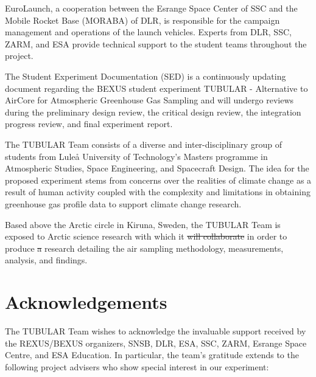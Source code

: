 \documentclass[a4paper,12pt,oneside]{article}
\providecommand{\DIFaddtex}[1]{{\protect\color{blue}\uwave{#1}}} %
\providecommand{\DIFdeltex}[1]{{\protect\color{red}\sout{#1}}}                      %
\providecommand{\DIFaddbegin}{} %
\providecommand{\DIFaddend}{} %
\providecommand{\DIFdelbegin}{} %
\providecommand{\DIFdelend}{} %
\providecommand{\DIFadd}[1]{\texorpdfstring{\DIFaddtex{#1}}{#1}} %
\providecommand{\DIFdel}[1]{\texorpdfstring{\DIFdeltex{#1}}{}} %
\newcommand{\DIFscaledelfig}{0.5}
\newlength{\DIFdelgraphicswidth} %
\newlength{\DIFdelgraphicsheight} %
\newcommand{\DIFaddincludegraphics}[2][]{{\color{blue}\fbox{\DIFOincludegraphics[#1]{#2}}}} %
\newcommand{\DIFdelincludegraphics}[2][]{%
\sbox{\DIFdelgraphicsbox}{\DIFOincludegraphics[#1]{#2}}%
\settoboxwidth{\DIFdelgraphicswidth}{\DIFdelgraphicsbox} %
\settoboxtotalheight{\DIFdelgraphicsheight}{\DIFdelgraphicsbox} %
\scalebox{\DIFscaledelfig}{%
\parbox[b]{\DIFdelgraphicswidth}{\usebox{\DIFdelgraphicsbox}\\[-\baselineskip] \rule{\DIFdelgraphicswidth}{0em}}\llap{\resizebox{\DIFdelgraphicswidth}{\DIFdelgraphicsheight}{%
\setlength{\unitlength}{\DIFdelgraphicswidth}%
\begin{picture}(1,1)%
\thicklines\linethickness{2pt} %
{\color[rgb]{1,0,0}\put(0,0){\framebox(1,1){}}}%
{\color[rgb]{1,0,0}\put(0,0){\line( 1,1){1}}}%
{\color[rgb]{1,0,0}\put(0,1){\line(1,-1){1}}}%
\end{picture}%
}\hspace*{3pt}}} %
} %
\DeclareRobustCommand{\DIFaddbegin}{\DIFOaddbegin \let\includegraphics\DIFaddincludegraphics} %
\DeclareRobustCommand{\DIFaddend}{\DIFOaddend \let\includegraphics\DIFOincludegraphics} %
\DeclareRobustCommand{\DIFdelbegin}{\DIFOdelbegin \let\includegraphics\DIFdelincludegraphics} %
\DeclareRobustCommand{\DIFdelend}{\DIFOaddend \let\includegraphics\DIFOincludegraphics} %
\begin{document}
EuroLaunch, a cooperation between the Esrange Space Center of SSC and the Mobile Rocket Base (MORABA) of DLR, is responsible for the campaign management and operations of the launch vehicles. Experts from DLR, SSC, ZARM, and ESA provide
technical support to the student teams throughout the project.

The Student Experiment Documentation (SED) is a continuously updating document regarding the BEXUS student experiment TUBULAR - Alternative to AirCore for Atmospheric Greenhouse Gas Sampling and will undergo reviews during the preliminary design review, the critical design review, the integration progress review, and final experiment report.

The TUBULAR Team consists of a diverse and inter-disciplinary group of students from Luleå University of Technology's Masters programme in Atmospheric Studies, Space Engineering, and Spacecraft Design. The idea for the proposed experiment stems from concerns over the realities of climate change as a result of human activity coupled with the complexity and limitations in obtaining greenhouse gas profile data to support climate change research.

Based above the Arctic circle in Kiruna, Sweden, the TUBULAR Team is exposed to Arctic science research with which it \DIFdelbegin \DIFdel{will collaborate }\DIFdelend \DIFaddbegin \DIFadd{has collaborated }\DIFaddend in order to produce \DIFdelbegin \DIFdel{a }\DIFdelend research detailing the air sampling methodology, measurements, analysis, and findings.



\newpage
\section*{Acknowledgements} \markboth{}{}

The TUBULAR Team wishes to acknowledge the invaluable support received by the REXUS/BEXUS organizers, SNSB, DLR, ESA, SSC, ZARM, Esrange Space Centre, and ESA Education. In particular, the team's gratitude extends to the following project advisers who show special interest in our experiment:
\end{document}
